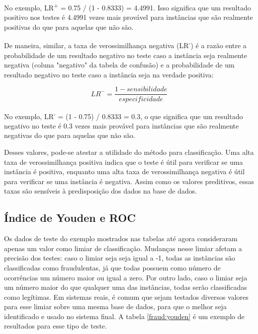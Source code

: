 No exemplo, LR\textsuperscript{+} = 0.75 / (1 - 0.8333) = 4.4991. Isso significa que um resultado positivo nos testes é 4.4991 vezes mais provável para instâncias que são realmente positivas do que para aquelas que não são.

De maneira, similar, a taxa de verossimilhança negativa (LR\textsuperscript{-}) é a razão entre a probabilidade de um resultado negativo no teste caso a instância seja realmente negativa (coluna "negativo" da tabela de confusão) e a probabilidade de um resultado negativo no teste caso a instância seja na verdade positiva:

\vspace{2mm}
\begin{equation}
    LR^{-}=\frac{1 - sensibilidade}{especificidade}
\end{equation}
\vspace{2mm}

No exemplo, LR\textsuperscript{-} = (1 - 0.75) / 0.8333 = 0.3, o que significa que um resultado negativo no teste é 0.3 vezes mais provável para instâncias que são realmente negativas do que para aquelas que não são.

Desses valores, pode-se atestar a utilidade do método para classificação. Uma alta taxa de verossimilhança positiva indica que o teste é útil para verificar se uma instância é positiva, enquanto uma alta taxa de verossimilhança negativa é útil para verificar se uma instância é negativa. Assim como os valores preditivos, essas taxas são sensíveis à predisposição dos dados na base de dados.

\subsection{Índice de Youden e ROC}

Os dados de teste do exemplo mostrados nas tabelas até agora consideraram apenas um valor como limiar de classificação. Mudanças nesse limiar afetam a precisão dos testes: caso o limiar seja seja igual a -1, todas as instâncias são classificadas como fraudulentas, já que todas possuem como número de ocorrências um número maior ou igual a zero. Por outro lado, caso o limiar seja um número maior do que qualquer uma das instâncias, todas serão classificadas como legítimas. Em sistemas reais, é comum que sejam testados diversos valores para esse limiar sobre uma mesma base de dados, para que o melhor seja identificado e usado no sistema final. A tabela \ref{fraud:youden} é um exemplo de resultados para esse tipo de teste.

